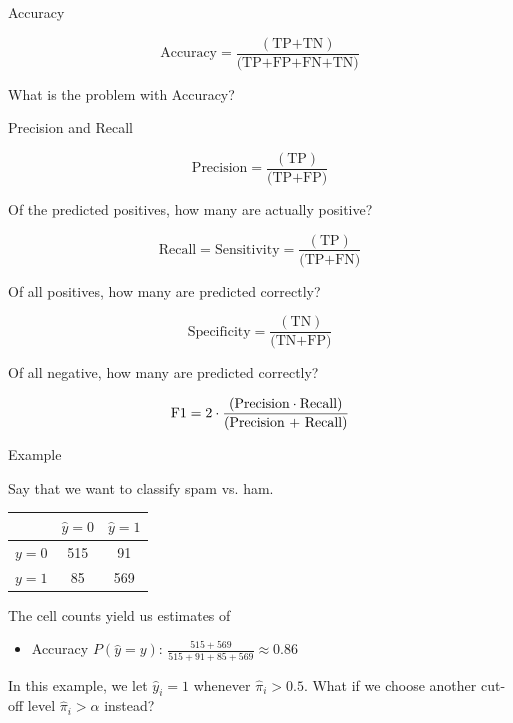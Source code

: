 \documentclass[10pt,handout]{beamer}
\begin{document}
\begin{frame}{Accuracy}


\[
\text{Accuracy} = \frac{(\text{TP+TN})}{\text{(TP+FP+FN+TN)}}
\]\pause

What is the problem with Accuracy?

\end{frame}

\begin{frame}{Precision and Recall}


\[
\text{Precision} = \frac{(\text{TP})}{\text{(TP+FP)}}
\]

Of the predicted positives, how many are actually positive?\pause

\[
\text{Recall} = \text{Sensitivity} = \frac{(\text{TP})}{\text{(TP+FN)}}
\]

Of all positives, how many are predicted correctly?\pause

\[
\text{Specificity} = \frac{(\text{TN})}{\text{(TN+FP)}}
\]

Of all negative, how many are predicted correctly?\pause

\[
\text{F1} = 2 \cdot \frac{(\text{Precision} \cdot \text{Recall})}{\text{(\text{Precision} + \text{Recall})}}
\]


\end{frame}


\begin{frame}{Example}

Say that we want to classify spam vs. ham. \\[3mm]\pause

\begin{center}
\begin{tabular}{ l | c | c }
  & $\hat{y}=0$ & $\hat{y}=1$\\
  \hline
  $y=0$ & 515 & 91 \\
  $y=1$ & 85 & 569 \\
  \hline
\end{tabular}
\end{center}
The cell counts yield us estimates of
\begin{itemize}
\item Accuracy $P(\hat{y}=y)$: $\frac{515+569}{515+91+85+569}\approx 0.86$\\[3mm]\pause
\end{itemize}

In this example, we let $\hat{y}_i=1$ whenever $\hat{\pi}_i>0.5$. What if we choose another cut-off level $\hat{\pi}_i>\alpha$ instead?

\end{frame}
\end{document}
